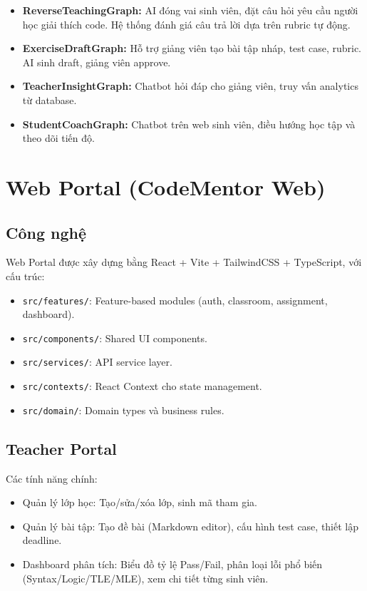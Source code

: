 \begin{itemize}
    \item \textbf{ReverseTeachingGraph:} AI đóng vai sinh viên, đặt câu hỏi yêu cầu người học giải thích code. Hệ thống đánh giá câu trả lời dựa trên rubric tự động.
    \item \textbf{ExerciseDraftGraph:} Hỗ trợ giảng viên tạo bài tập nháp, test case, rubric. AI sinh draft, giảng viên approve.
    \item \textbf{TeacherInsightGraph:} Chatbot hỏi đáp cho giảng viên, truy vấn analytics từ database.
    \item \textbf{StudentCoachGraph:} Chatbot trên web sinh viên, điều hướng học tập và theo dõi tiến độ.
\end{itemize}

\section{Web Portal (CodeMentor Web)}

\subsection{Công nghệ}

Web Portal được xây dựng bằng React + Vite + TailwindCSS + TypeScript, với cấu trúc:

\begin{itemize}
    \item \texttt{src/features/}: Feature-based modules (auth, classroom, assignment, dashboard).
    \item \texttt{src/components/}: Shared UI components.
    \item \texttt{src/services/}: API service layer.
    \item \texttt{src/contexts/}: React Context cho state management.
    \item \texttt{src/domain/}: Domain types và business rules.
\end{itemize}

\subsection{Teacher Portal}

Các tính năng chính:
\begin{itemize}
    \item Quản lý lớp học: Tạo/sửa/xóa lớp, sinh mã tham gia.
    \item Quản lý bài tập: Tạo đề bài (Markdown editor), cấu hình test case, thiết lập deadline.
    \item Dashboard phân tích: Biểu đồ tỷ lệ Pass/Fail, phân loại lỗi phổ biến (Syntax/Logic/TLE/MLE), xem chi tiết từng sinh viên.
\end{itemize}

